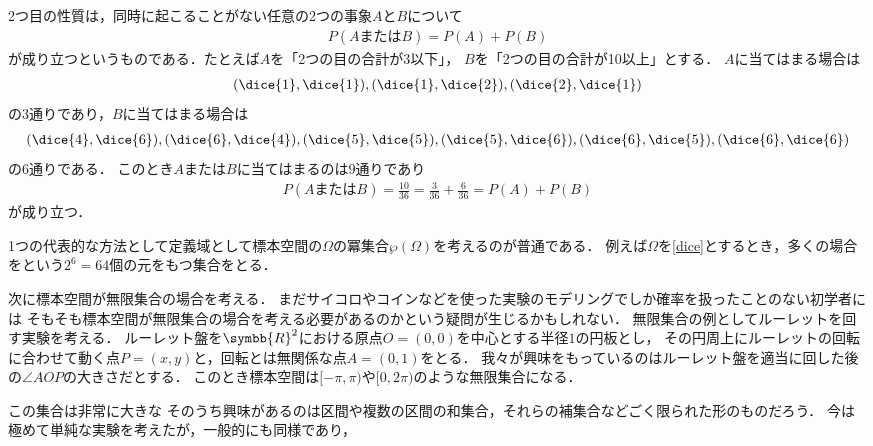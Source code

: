 \documentclass[main.tex]{subfiles}
\begin{document}
2つ目の性質は，同時に起こることがない任意の2つの事象\(A\)と\(B\)について
\begin{align*}
    P(\text{\(A\)または\(B\)}) = P(A) + P(B)
\end{align*}
が成り立つというものである．たとえば\(A\)を「2つの目の合計が3以下」，
\(B\)を「2つの目の合計が10以上」とする．
\(A\)に当てはまる場合は
\begin{align*}
    (\dice{1}, \dice{1}), (\dice{1}, \dice{2}), (\dice{2}, \dice{1})
\end{align*}
の3通りであり，\(B\)に当てはまる場合は
\begin{align*}
    (\dice{4}, \dice{6}), (\dice{6}, \dice{4}), (\dice{5}, \dice{5}),
    (\dice{5}, \dice{6}), (\dice{6}, \dice{5}), (\dice{6}, \dice{6})
\end{align*}
の6通りである．
このとき\(A\)または\(B\)に当てはまるのは\(9\)通りであり
\begin{align*}
    P(\text{\(A\)または\(B\)}) = \frac{10}{36} = \frac{3}{36} + \frac{6}{36} = P(A) + P(B)
\end{align*}
が成り立つ．

1つの代表的な方法として定義域として標本空間の\(\Omega\)の冪集合\(\wp(\Omega)\)を考えるのが普通である．
例えば\(\Omega\)を\eqref{dice}とするとき，多くの場合
をという\(2^6 = 64\)個の元をもつ集合をとる．

次に標本空間が無限集合の場合を考える．
まだサイコロやコインなどを使った実験のモデリングでしか確率を扱ったことのない初学者には
そもそも標本空間が無限集合の場合を考える必要があるのかという疑問が生じるかもしれない．
無限集合の例としてルーレットを回す実験を考える．
ルーレット盤を\(\symbb{R}^2\)における原点\(O = (0, 0)\)を中心とする半径\(1\)の円板とし，
その円周上にルーレットの回転に合わせて動く点\(P = (x, y)\)と，回転とは無関係な点\(A = (0, 1)\)をとる．
我々が興味をもっているのはルーレット盤を適当に回した後の\(\angle AOP\)の大きさだとする．
このとき標本空間は\([-\pi, \pi)\)や\([0, 2\pi)\)のような無限集合になる．

この集合は非常に大きな
そのうち興味があるのは区間や複数の区間の和集合，それらの補集合などごく限られた形のものだろう．
今は極めて単純な実験を考えたが，一般的にも同様であり，
\end{document}
